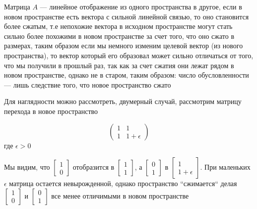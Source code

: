 \documentclass{article}
\begin{document}
    Матрица $A$ --- линейное отображение из одного пространства в другое, если в новом пространстве есть вектора с сильной линейной связью, то
    оно становится более сжатым, т.е непохожие вектора в исходном пространстве могут стать сильно более похожими в новом пространстве за счет того,
    что оно сжато в размерах, таким образом если мы немного изменим целевой вектор (из нового пространства), то вектор который его образовал может сильно отличаться от того, что мы
    получили в прошлый раз, так как за счет сжатия они лежат рядом в новом пространстве, однако не в старом, таким образом: число обусловленности ---
    лишь следствие того, что новое пространство сжато

    Для наглядности можно рассмотреть, двумерный случай,
    рассмотрим матрицу перехода в новое пространство

    \[
    \begin{pmatrix}
    1 & 1 \\

    1 & 1 + \epsilon
    \end{pmatrix}
    \]
    где $\epsilon > 0$

    Мы видим, что $ \left[ \begin{smallmatrix} 1 \\ 0 \end{smallmatrix} \right] $ отобразится в $ \left[ \begin{smallmatrix} 1 \\ 1 \end{smallmatrix} \right] $, а
    $ \left[ \begin{smallmatrix} 0 \\ 1 \end{smallmatrix} \right] $ в $ \left[ \begin{smallmatrix} 1 \\ 1 + \epsilon \end{smallmatrix} \right] $.
    При маленьких $\epsilon$ матрица остается невырожденной, однако пространство ``сжимается`` делая $ \left[ \begin{smallmatrix} 1 \\ 0 \end{smallmatrix} \right] $ и
    $ \left[ \begin{smallmatrix} 0 \\ 1 \end{smallmatrix} \right] $ все менее отличимыми в новом пространстве
\end{document}
